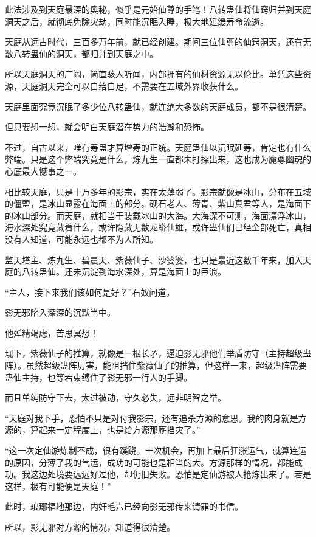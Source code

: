 \begin{this_body}
此法涉及到天庭最深的奥秘，似乎是元始仙尊的手笔！八转蛊仙将仙窍归并到天庭洞天之后，就彻底免除灾劫，同时能沉眠入睡，极大地延缓寿命流逝。

天庭从远古时代，三百多万年前，就已经创建。期间三位仙尊的仙窍洞天，还有无数八转蛊仙的洞天，都归并到天庭之中。

所以天庭洞天的广阔，简直骇人听闻，内部拥有的仙材资源无以伦比。单凭这些资源，天庭洞天完全可以自给自足，不需要在五域外界收获什么。

天庭里面究竟沉眠了多少位八转蛊仙，就连绝大多数的天庭成员，都不是很清楚。

但只要想一想，就会明白天庭潜在势力的浩瀚和恐怖。

不过，自古以来，唯有寿蛊才算增寿的正统。天庭蛊仙以沉眠延寿，肯定也有什么弊端。只是这个弊端究竟是什么，炼九生一直都未打探出来，这也成为魔尊幽魂的心底最大憾事之一。

相比较天庭，只是十万多年的影宗，实在太薄弱了。影宗就像是冰山，分布在五域的僵盟，是冰山显露在海面上的部分。砚石老人、薄青、紫山真君等人，是海面下的冰山部分。而天庭，就相当于装载冰山的大海。大海深不可测，海面漂浮冰山，海水深处究竟藏着什么，或许隐藏无数龙蟒仙雄，或许蛊仙们已经全部死亡，真相没有人知道，可能永远也都不为人所知。

监天塔主、炼九生、碧晨天、紫薇仙子、沙婆婆，也只是最近这数千年来，加入天庭的八转蛊仙。还未沉淀到海水深处，算是海面上的巨浪。

“主人，接下来我们该如何是好？”石奴问道。

影无邪陷入深深的沉默当中。

他殚精竭虑，苦思冥想！

现下，紫薇仙子的推算，就像是一根长矛，逼迫影无邪他们举盾防守（主持超级蛊阵）。虽然超级蛊阵厉害，能阻挡住紫薇仙子的推算，但这样一来，超级蛊阵需要蛊仙主持，也等若束缚住了影无邪一行人的手脚。

而且单纯防守下去，太过被动，守久必失，远非明智之举。

“天庭对我下手，恐怕不只是对付我影宗，还有追杀方源的意思。我的肉身就是方源的，算起来一定程度上，也是给方源那厮挡灾了。”

“这一次定仙游炼制不成，很有蹊跷。十次机会，再加上最后狂涨运气，就算连运的原因，分薄了我的气运，成功的可能也是相当的大。方源那样的情况，都能成功。我这边处境要远远好过他，却仍旧失败。恐怕是定仙游被人抢炼出来了。若是这样，极有可能便是天庭！”

此时，琅琊福地那边，内奸毛六已经向影无邪传来请罪的书信。

所以，影无邪对方源的情况，知道得很清楚。


\end{this_body}
